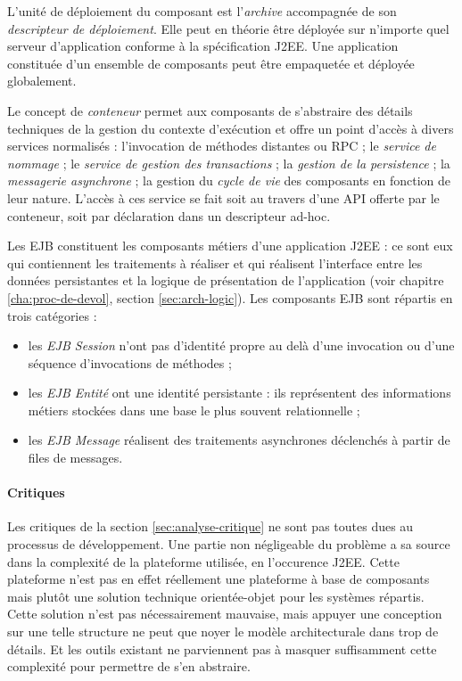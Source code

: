 L'unit\'e de d\'eploiement du composant est l'\emph{archive}
accompagn\'ee de son \emph{descripteur de d\'eploiement}. Elle peut
en th\'eorie \^etre d\'eploy\'ee sur n'importe quel serveur 
d'application  conforme \`a la sp\'ecification \textsf{J2EE}. Une application constitu\'ee d'un ensemble
de composants peut \^etre empaquet\'ee et d\'eploy\'ee globalement.  

Le concept de \emph{conteneur} permet aux composants de s'abstraire
des d\'etails techniques de la gestion du contexte d'ex\'ecution et
offre un point d'acc\`es \`a divers services normalis\'es :
l'invocation de m\'ethodes distantes ou \textsf{RPC} ; le
\emph{service de nommage} ; le \emph{service de gestion des
  transactions}  ; la \emph{gestion de la persistence} ; la
\emph{messagerie asynchrone} ; la gestion du \emph{cycle de vie} des composants en fonction de leur
  nature. L'acc\`es \`a ces service se fait soit au travers d'une
  \textsf{API} offerte par le conteneur, soit par d\'eclaration dans
  un descripteur ad-hoc.

Les \textsf{EJB} constituent les composants m\'etiers d'une
application \textsf{J2EE} : ce sont eux qui contiennent les
traitements \`a r\'ealiser et qui r\'ealisent l'interface entre les
donn\'ees persistantes et la logique de pr\'esentation de
l'application (voir chapitre \ref{cha:proc-de-devol}, section
\ref{sec:arch-logic}). 
Les composants \textsf{EJB} sont r\'epartis en trois cat\'egories : 
\begin{itemize}
  \item les \emph{EJB Session} n'ont pas d'identit\'e propre au
    del\`a d'une invocation ou d'une s\'equence d'invocations de
    m\'ethodes ; 
  \item les \emph{EJB Entit\'e} ont une identit\'e persistante : ils
  repr\'esentent des informations m\'etiers stock\'ees dans une
  base le plus souvent relationnelle ;
  \item les \emph{EJB Message} r\'ealisent des traitements
  asynchrones d\'eclench\'es \`a partir de files de messages. 
\end{itemize}

\paragraph{Critiques}

Les critiques de la section \ref{sec:analyse-critique} ne sont pas
toutes dues au processus de d\'eveloppement. Une partie non
n\'egligeable du probl\`eme a sa source dans la complexit\'e de la
plateforme utilis\'ee, en l'occurence \textsf{J2EE}. Cette plateforme
n'est pas en effet r\'eellement une plateforme \`a base de
composants mais plut\^ot une solution technique orient\'ee-objet
pour les syst\`emes r\'epartis. Cette solution n'est pas
n\'ecessairement mauvaise, mais appuyer une conception sur une telle
structure ne peut que noyer le mod\`ele architecturale dans trop de
d\'etails. Et les outils existant ne parviennent pas \`a masquer
suffisamment cette complexit\'e pour permettre de s'en abstraire.

